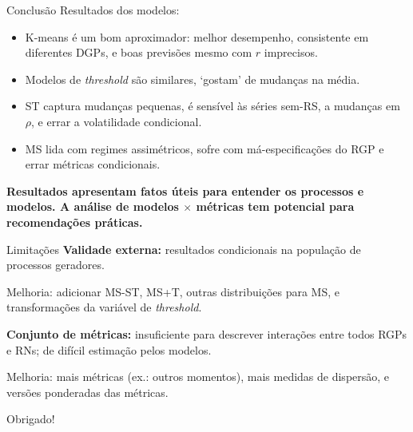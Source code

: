 \documentclass[
  ignorenonframetext,
  brazilian,
]{beamer}
\providecommand{\tightlist}{%
  \setlength{\itemsep}{0pt}\setlength{\parskip}{0pt}}\usepackage{longtable,booktabs,array}
\begin{document}
\begin{frame}{Conclusão}
\label{conclusuxe3o-2}
Resultados dos modelos:

\begin{itemize}
\tightlist
\item
  K-means é um bom aproximador: melhor desempenho, consistente em
  diferentes DGPs, e boas previsões mesmo com \(r\) imprecisos.
\item
  Modelos de \emph{threshold} são similares, `gostam' de mudanças na
  média.
\item
  ST captura mudanças pequenas, é sensível às séries sem-RS, a mudanças
  em \(\rho\), e errar a volatilidade condicional.
\item
  MS lida com regimes assimétricos, sofre com má-especificações do RGP e
  errar métricas condicionais.
\end{itemize}

\pause

\textbf{Resultados apresentam fatos úteis para entender os processos e
modelos. A análise de modelos \(\times\) métricas tem potencial para
recomendações práticas.}
\end{frame}

\begin{frame}{Limitações}
\label{limitauxe7uxf5es}
\textbf{Validade externa:} resultados condicionais na população de
processos geradores.

Melhoria: adicionar MS-ST, MS+T, outras distribuições para MS, e
transformações da variável de \emph{threshold}.

\textbf{Conjunto de métricas:} insuficiente para descrever interações
entre todos RGPs e RNs; de difícil estimação pelos modelos.

Melhoria: mais métricas (ex.: outros momentos), mais medidas de
dispersão, e versões ponderadas das métricas.
\end{frame}

\begin{frame}
\begin{center}
\Huge Obrigado!
\end{center}
\end{frame}
\end{document}
